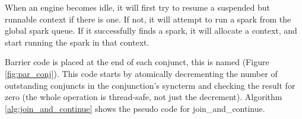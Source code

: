 
%
%

When an engine becomes idle, it will first try
to resume a suspended but runnable context if there is one.
If not, it will attempt to run a spark from the global spark queue.
If it successfully finds a spark, it will allocate a context,
and start running the spark in that context.


Barrier code is placed at the end of each conjunct,
this is named  (Figure \ref{fig:par_conj}).
This code starts by atomically decrementing the number of outstanding
conjuncts in the conjunction's syncterm and checking the result for zero
(the whole operation is thread-safe, not just the decrement).
Algorithm \ref{alg:join_and_continue} shows the pseudo code for
join\_and\_continue.


%
%
%
%
